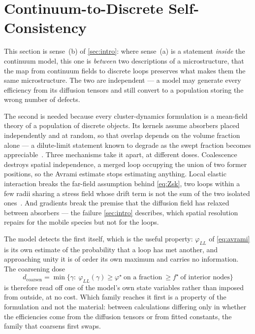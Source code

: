 \section{Continuum-to-Discrete Self-Consistency}\label{sec:conversion}%
\label{sec:coarsening}\label{sec:why-discrete}\label{sec:transfer}%
\label{sec:gb-loops}\label{sec:ledger}

This section is sense~(b) of \cref{sec:intro}: where sense~(a) is a statement
\emph{inside} the continuum model, this one is \emph{between} two descriptions
of a microstructure, that the map from continuum fields to discrete loops
preserves what makes them the same microstructure. The two are independent --- a
model may generate every efficiency from its diffusion tensors and still convert
to a population storing the wrong number of defects.

The second is needed because every cluster-dynamics formulation is a mean-field
theory of a population of discrete objects. Its kernels assume absorbers placed
independently and at random, so that overlap depends on the volume fraction
alone --- a dilute-limit statement known to degrade as the swept fraction
becomes
appreciable~\citep{BrailsfordBullough1972,Mansur1978,GolubovSingh2001}. Three
mechanisms take it apart, at different doses. Coalescence destroys spatial
independence, a merged loop occupying the union of two former positions, so the
Avrami estimate stops estimating anything. Local elastic interaction breaks the
far-field assumption behind \cref{eq:Zsk}, two loops within a few radii sharing
a stress field whose drift term is not the sum of the two isolated
ones~\citep{marchrico2023,marchrico2025}. And gradients break the premise that
the diffusion field has relaxed between absorbers --- the failure
\cref{sec:intro} describes, which spatial resolution repairs for the mobile
species but not for the loops.

The model detects the first itself, which is the useful property: $\varphi_{LL}$
of \cref{eq:avrami} is its own estimate of the probability that a loop has met
another, and approaching unity it is of order its own maximum and carries no
information. The coarsening dose
\begin{equation}
  d_{\mathrm{coarsen}}
  = \min\bigl\{\gamma:\ \varphi_{LL}(\gamma)\ge\varphi^{\star}
    \ \text{on a fraction}\ \ge f^{\star}\ \text{of interior nodes}\bigr\}
  \label{eq:dcoarsen}
\end{equation}
is therefore read off one of the model's own state variables rather than imposed
from outside, at no cost. Which family reaches it first is a property of the
formulation and not the material: between calculations differing only in whether
the efficiencies come from the diffusion tensors or from fitted constants, the
family that coarsens first swaps.

